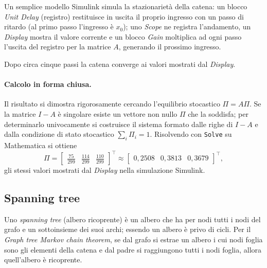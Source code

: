 Un semplice modello Simulink simula la stazionarietà della catena: un blocco
\emph{Unit Delay} (registro) restituisce in uscita il proprio ingresso con un passo di
ritardo (al primo passo l'ingresso è $x_0$); uno \emph{Scope} ne registra l'andamento, un
\emph{Display} mostra il valore corrente e un blocco \emph{Gain} moltiplica ad ogni passo
l'uscita del registro per la matrice $A$, generando il prossimo ingresso.


Dopo circa cinque passi la catena converge ai valori mostrati dal \emph{Display}.


\paragraph{Calcolo in forma chiusa.}
Il risultato si dimostra rigorosamente cercando l'equilibrio stocastico $\Pi=A\Pi$. Se la
matrice $I-A$ è singolare esiste un vettore non nullo $\Pi$ che la soddisfa; per
determinarlo univocamente si costruisce il sistema formato dalle righe di $I-A$ e dalla
condizione di stato stocastico $\sum_i \Pi_i=1$. Risolvendo con \texttt{Solve} su
Mathematica si ottiene
\[
\Pi=\begin{bmatrix}\tfrac{75}{299}&\tfrac{114}{299}&\tfrac{110}{299}\end{bmatrix}^{\!\top}
\approx\begin{bmatrix}0{,}2508&0{,}3813&0{,}3679\end{bmatrix}^{\!\top},
\]
gli stessi valori mostrati dal \emph{Display} nella simulazione Simulink.


\subsection{Spanning tree}
Uno \emph{spanning tree} (albero ricoprente) è un albero che ha per nodi tutti i nodi del
grafo e un sottoinsieme dei suoi archi; essendo un albero è privo di cicli. Per il
\emph{Graph tree Markov chain theorem}, se dal grafo si estrae un albero i cui nodi foglia
sono gli elementi della catena e dal padre si raggiungono tutti i nodi foglia, allora
quell'albero è ricoprente.

